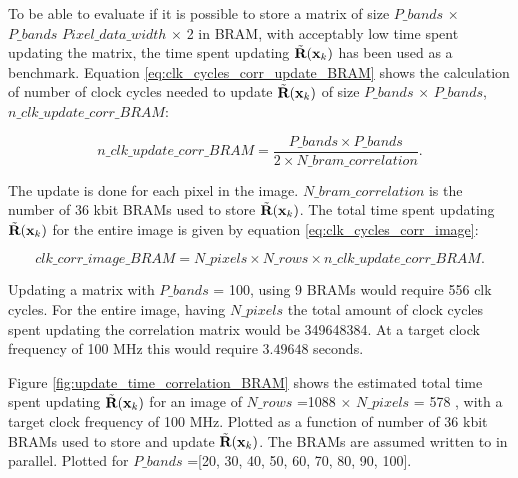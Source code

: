 To be able to evaluate if it is possible to store a matrix of size $P\_bands$ $\times$ $P\_bands$ $Pixel\_data\_width$ $\times$ 2 in BRAM, with acceptably low time spent updating the matrix, the time spent updating $\Tilde{\textbf{R}}(\textbf{x}_k)$ has been used as a benchmark. Equation \ref{eq:clk_cycles_corr_update_BRAM} shows the calculation of number of clock cycles needed to update $\Tilde{\textbf{R}}(\textbf{x}_k)$ of size $P\_bands$ $\times$ $P\_bands$, $n\_clk\_update\_corr\_BRAM$: 

\begin{equation}
    n\_clk\_update\_corr\_BRAM = \frac{P\_bands \times P\_bands }{2 \times N\_bram\_correlation}.
    \label{eq:clk_cycles_corr_update_BRAM}
\end{equation}


The update is done for each pixel in the image. $N\_bram\_correlation$ is the number of 36 kbit BRAMs used to store $\Tilde{\textbf{R}}(\textbf{x}_k)$. The total time spent updating $\Tilde{\textbf{R}}(\textbf{x}_k)$ for the entire image is given by equation \ref{eq:clk_cycles_corr_image}:

\begin{equation}
    clk\_corr\_image\_BRAM = N\_pixels \times N\_rows \times n\_clk\_update\_corr\_BRAM.
    \label{eq:clk_cycles_corr_image}
\end{equation}

Updating a matrix with $P\_bands$ = 100, using 9 BRAMs would require 556 clk cycles. For the entire image, having $N\_pixels$ the total amount of clock cycles spent updating the correlation matrix would be 349648384. At a target clock frequency of 100 MHz this would require $3.49648$ seconds.





Figure \ref{fig:update_time_correlation_BRAM} shows the estimated total time spent updating $\Tilde{\textbf{R}}(\textbf{x}_k)$ for an image of $N\_rows$ =1088 $\times$ $N\_pixels$ = 578 , with a target clock frequency of 100 MHz. Plotted as a function of number of 36 kbit BRAMs used to store and update $\Tilde{\textbf{R}}(\textbf{x}_k)$. The BRAMs are assumed written to in parallel. Plotted for $P\_bands$ =[20, 30, 40, 50, 60, 70, 80, 90, 100].


